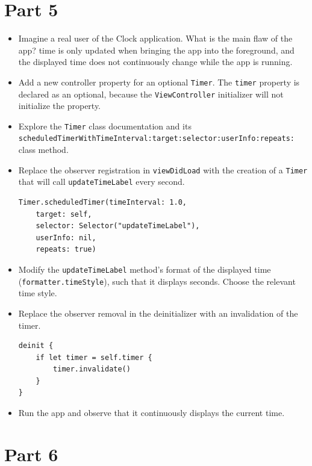 \documentclass[a4paper,11pt]{scrartcl}
\begin{document}
\section*{Part 5}

\begin{itemize}
\item Imagine a real user of the Clock application. What is the main flaw of the app? time is only updated when bringing the app into the foreground, and the displayed time does not continuously change while the app is running.
\item Add a new controller property for an optional \texttt{Timer}. The \texttt{timer} property is declared as an optional, because the \texttt{ViewController} initializer will not initialize the property.
\item Explore the \texttt{Timer} class documentation and its \\\texttt{scheduledTimerWithTimeInterval:target:selector:userInfo:repeats:} class method.
\item Replace the observer registration in \texttt{viewDidLoad} with the creation of a \texttt{Timer} that will call \texttt{updateTimeLabel} every second.
\begin{lstlisting}
Timer.scheduledTimer(timeInterval: 1.0, 
	target: self, 
	selector: Selector("updateTimeLabel"), 
	userInfo: nil, 
	repeats: true)
\end{lstlisting}
\item Modify the \texttt{updateTimeLabel} method's format of the displayed time (\texttt{formatter.timeStyle}), such that it displays seconds. Choose the relevant time style.
\item Replace the observer removal in the deinitializer with an invalidation of the timer.
\begin{lstlisting}
deinit {
	if let timer = self.timer {
		timer.invalidate()
	}
}
\end{lstlisting}
\item Run the app and observe that it continuously displays the current time.
\end{itemize}

\section*{Part 6}
\end{document}
